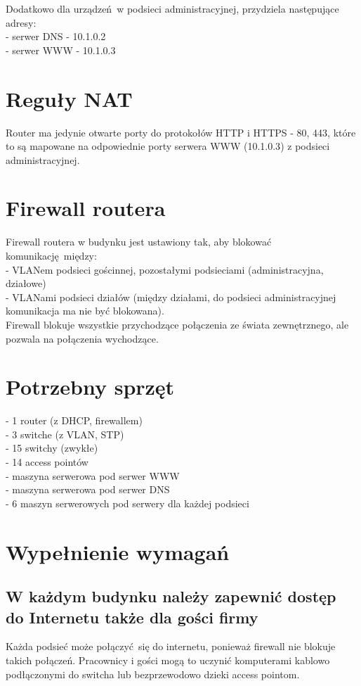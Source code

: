 \documentclass{article}
\begin{document}
    Dodatkowo dla urządzeń w \textcolor{kolorAdministracyjna}{podsieci administracyjnej}, przydziela następujące adresy: \\
    - serwer DNS - \textcolor{kolorAdministracyjna}{10.1.0.2} \\
    - serwer WWW - \textcolor{kolorAdministracyjna}{10.1.0.3}


  \section{Reguły NAT}
    Router ma jedynie otwarte porty do protokołów HTTP i HTTPS - 80, 443, które to są mapowane na odpowiednie porty serwera WWW (\textcolor{kolorAdministracyjna}{10.1.0.3}) z \textcolor{kolorAdministracyjna}{podsieci administracyjnej}.


  \section{Firewall routera}
    Firewall routera w budynku jest ustawiony tak, aby blokować komunikację między: \\
    - VLANem podsieci gościnnej, pozostałymi podsieciami (administracyjna, działowe) \\
    - VLANami podsieci działów (między działami, do podsieci administracyjnej komunikacja ma nie być blokowana). \\
    Firewall blokuje wszystkie przychodzące połączenia ze świata zewnętrznego, ale pozwala na połączenia wychodzące.



  \section{Potrzebny sprzęt}
    - 1 router (z DHCP, firewallem) \\
    - 3 switche (z VLAN, STP) \\
    - 15 switchy (zwykłe) \\
    - 14 access pointów \\
    - maszyna serwerowa pod serwer WWW \\
    - maszyna serwerowa pod serwer DNS \\
    - 6 maszyn serwerowych pod serwery dla każdej podsieci


  \section{Wypełnienie wymagań}
    \subsection{W każdym budynku należy zapewnić dostęp do Internetu także dla gości firmy}
      Każda podsieć może połączyć się do internetu, ponieważ firewall nie blokuje takich połączeń.
      Pracownicy i gości mogą to uczynić komputerami kablowo podłączonymi do switcha lub bezprzewodowo dzieki access pointom.
\end{document}
